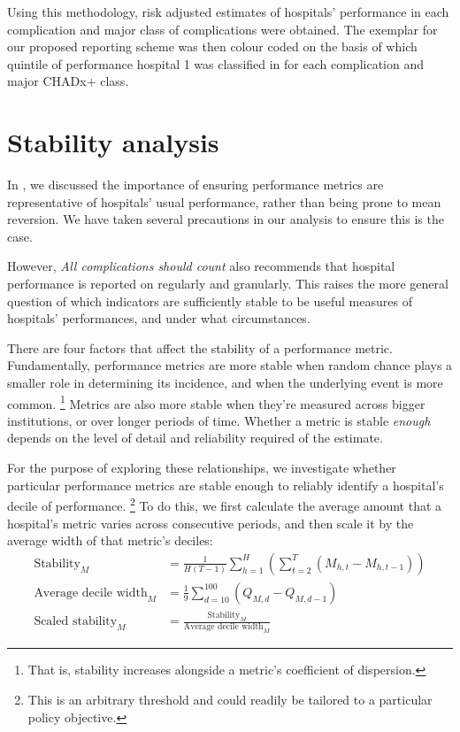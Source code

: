\documentclass[submission]{grattan}
\newcommand*{\myTitle}{All complications should count}
\begin{document}
Using this methodology, risk adjusted estimates of hospitals' performance in each complication and major class of complications were obtained.
The exemplar for our proposed reporting scheme was then colour coded on the basis of which quintile of performance hospital 1 was classified in for each complication and major CHADx+ class.

\section{Stability analysis}\label{sec:stability-analysis}

In , we discussed the importance of ensuring performance metrics are representative of hospitals' usual performance, rather than being prone to mean reversion.
We have taken several precautions in our analysis to ensure this is the case.

However, \textit{\myTitle} also recommends that hospital performance is reported on regularly and granularly.
This raises the more general question of which indicators are sufficiently stable to be useful measures of hospitals' performances, and under what circumstances.

There are four factors that affect the stability of a performance metric.
Fundamentally, performance metrics are more stable when random chance plays a smaller role in determining its incidence, and when the underlying event is more common.%
\footnote{That is, stability increases alongside a metric's coefficient of dispersion.}
Metrics are also more stable when they're measured across bigger institutions, or over longer periods of time.
Whether a metric is stable \emph{enough} depends on the level of detail and reliability required of the estimate.

For the purpose of exploring these relationships, we investigate whether particular performance metrics are stable enough to reliably identify a hospital's decile of performance.%
\footnote{This is an arbitrary threshold and could readily be tailored to a particular policy objective.}
To do this, we first calculate the average amount that a hospital's metric varies across consecutive periods, and then scale it by the average width of that metric's deciles:
\begin{align*}
\text{Stability}_{M} &= \frac{1}{H(T-1)}\sum_{h = 1}^{H} \left(\sum_{t = 2}^T(M_{h,t} - M_{h,t - 1}) \right)\\
\text{Average\ decile\ width}_{M} &= \frac{1}{9}\sum_{d = 10}^{100}{(Q_{M, d} - Q_{M, d - 1})}\\
\text{Scaled\ stability}_{M} &= \frac{\text{Stability}_{M}}{\text{Average\ decile\ width}_{M}}
\end{align*}
\end{document}
